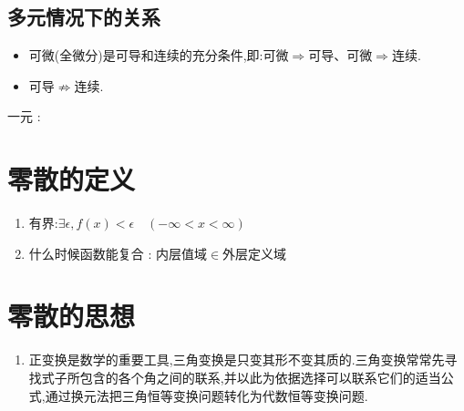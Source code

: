 {{{      \begin{center}
      \end{center}
  }%

  \subsection{多元情况下的关系}{
      \begin{itemize}
          \item 可微(全微分)是可导和连续的充分条件,即:可微$\Rightarrow$可导、可微$\Rightarrow$连续.
          \item 可导$\nRightarrow$连续.
      \end{itemize}

      \begin{center}
          一元 :
      \end{center}
  }%

 }%

\section{零散的定义}{
  \begin{enumerate}
      \item 有界:$\exists\epsilon,f(x) < \epsilon\quad(-\infty < x < \infty )$
      \item 什么时候函数能复合 : 内层值域$\in$外层定义域
  \end{enumerate}
 }%

\section{零散的思想}{
  \begin{enumerate}
      \item 正变换是数学的重要工具,三角变换是只变其形不变其质的.三角变换常常先寻找式子所包含的各个角之间的联系,并以此为依据选择可以联系它们的适当公式,通过换元法把三角恒等变换问题转化为代数恒等变换问题.
  \end{enumerate}
 }%

}%
